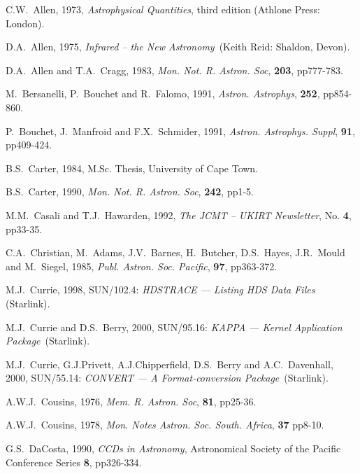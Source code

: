 \documentclass[twoside,11pt]{article}
\newcommand{\xref}[3]{#1}
\begin{document}
\newpage
{}
\begin{thebibliography}{99}

   C.W.~Allen, 1973, {\it Astrophysical Quantities},
   third edition (Athlone Press: London).

   D.A.~Allen, 1975, {\it Infrared -- the New
   Astronomy}\, (Keith Reid: Shaldon, Devon).

   D.A.~Allen and T.A.~Cragg, 1983, {\it Mon. Not. R.
   Astron. Soc}, {\bf 203}, pp777-783.

   M.~Bersanelli, P.~Bouchet and R.~Falomo, 1991,
   {\it Astron. Astrophys}, {\bf 252}, pp854-860.

   P.~Bouchet, J.~Manfroid and F.X.~Schmider, 1991,
   {\it Astron. Astrophys. Suppl}, {\bf 91}, pp409-424.

   B.S.~Carter, 1984, M.Sc. Thesis, University of
   Cape Town.

   B.S.~Carter, 1990, {\it Mon. Not. R. Astron. Soc},
   {\bf 242}, pp1-5.

   M.M.~Casali and T.J.~Hawarden, 1992, {\it The
   JCMT -- UKIRT Newsletter}, No. {\bf 4}, pp33-35.

   C.A.~Christian, M.~Adams, J.V.~Barnes,
   H.~Butcher, D.S.~Hayes, J.R.~Mould and M.~Siegel, 1985, {\it Publ.
   Astron. Soc. Pacific}, {\bf 97}, pp363-372.

   M.J.~Currie, 1998, \xref{SUN/102.4}{sun102}{}:
   {\it HDSTRACE --- Listing HDS Data Files}\, (Starlink).

   M.J.~Currie and D.S.~Berry, 2000,
   \xref{SUN/95.16}{sun95}{}: {\it KAPPA --- Kernel Application Package}\,
   (Starlink).

   M.J.~Currie, G.J.Privett, A.J.Chipperfield, D.S.~Berry
   and A.C.~Davenhall, 2000, \xref{SUN/55.14}{sun55}{}: {\it  CONVERT ---
   A Format-conversion Package}\, (Starlink).

   A.W.J.~Cousins, 1976, {\it Mem. R. Astron. Soc},
   {\bf 81}, pp25-36.

   A.W.J.~Cousins, 1978, {\it Mon. Notes Astron. Soc.
   South. Africa}, {\bf 37} pp8-10.

   G.S.~DaCosta, 1990, {\it CCDs in Astronomy},
   Astronomical Society of the Pacific Conference Series {\bf 8},
   pp326-334.


\end{thebibliography}
\end{document}
